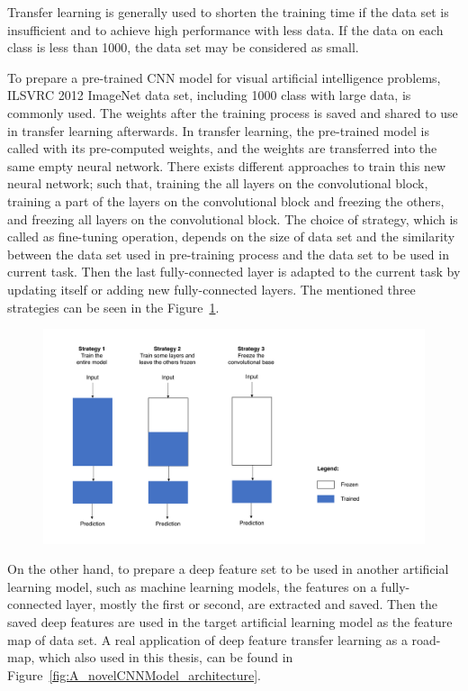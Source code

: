 Transfer learning is generally used to shorten the training time if the data set is insufficient and to achieve high performance with less data. If the data on each class is less than 1000, the data set may be considered as small. 

To prepare a pre-trained CNN model for visual artificial intelligence problems, ILSVRC 2012 ImageNet \cite{imagenet} data set, including 1000 class with large data, is commonly used. The weights after the training process is saved and shared to use in transfer learning afterwards. In transfer learning, the pre-trained model is called with its pre-computed weights, and the weights are transferred into the same empty neural network. There exists different approaches to train this new neural network; such that, training the all layers on the convolutional block, training a part of the layers on the convolutional block and freezing the others, and freezing all layers on the convolutional block. The choice of strategy, which is called as fine-tuning operation, depends on the size of data set and the similarity between the data set used in pre-training process and the data set to be used in current task. Then the last fully-connected layer is adapted to the current task by updating itself or adding new fully-connected layers. The mentioned three strategies can be seen in the Figure~\ref{fig:pretrain_strategies}.

\begin{figure}[h]
    \centering
    \includegraphics[width=.8\linewidth]{fig/pretrain_strategies.png}
	\vspace*{1mm}
    \label{fig:pretrain_strategies}
\end{figure}

On the other hand, to prepare a deep feature set to be used in another artificial learning model, such as machine learning models, the features on a fully-connected layer, mostly the first or second, are extracted and saved. Then the saved deep features are used in the target artificial learning model as the feature map of data set. A real application of deep feature transfer learning as a road-map, which also used in this thesis, can be found in Figure~\ref{fig:A_novelCNNModel_architecture}.

